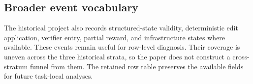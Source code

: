 \subsection{Broader event vocabulary}

The historical project also records structured-state validity, deterministic edit application, verifier entry, partial reward, and infrastructure states where available. These events remain useful for row-level diagnosis. Their coverage is uneven across the three historical strata, so the paper does not construct a cross-stratum funnel from them. The retained row table preserves the available fields for future task-local analyses.

